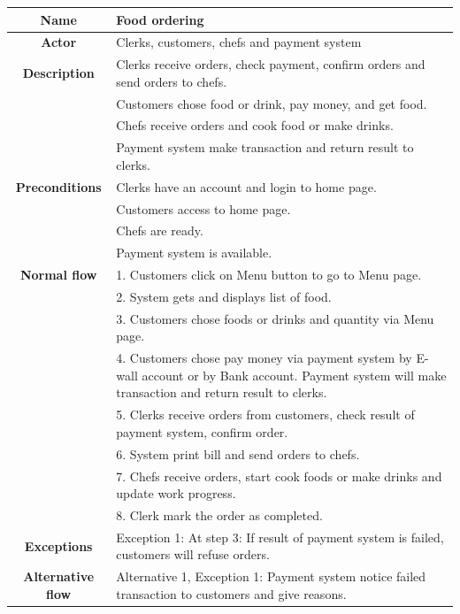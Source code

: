 \documentclass[11pt]{article}
\begin{document}
    \begin{table}[!h]
    \centering
        \begin{tabular}{|c|p{14cm}|}
        \hline
        \textbf{Name}  & \textbf{Food ordering} \\
        \hline
        \textbf{Actor} & Clerks, customers, chefs and payment system\\
        \hline
        \textbf{Description} & Clerks receive orders, check payment, confirm orders and send orders to chefs.\\
        {} & Customers chose food or drink, pay money, and get food.\\
        {} & Chefs receive orders and cook food or make drinks.\\
        {} & Payment system make transaction and return result to clerks.\\
        \hline
        \textbf{Preconditions} & Clerks have an account and login to home page.\\
        {} & Customers access to home page.\\
        {} & Chefs are ready.\\
        {} & Payment system is available.\\
        \hline
        \textbf{Normal flow} & 1. Customers click on Menu button to go to Menu page.\\
        {} & 2. System gets and displays list of food.\\
        {} & 3. Customers chose foods or drinks and quantity via Menu page.\\
        {} & 4. Customers chose pay money via payment system by E-wall account or by Bank account. Payment system will make transaction and return result to clerks.\\
        {} & 5. Clerks receive orders from customers, check result of payment system, confirm order.\\
        {} & 6. System print bill and send orders to chefs.\\
        {} & 7. Chefs receive orders, start cook foods or make drinks and update work progress.\\
        {} & 8. Clerk mark the order as completed.\\
        \hline
        \textbf{Exceptions} & Exception 1: At step 3: If result of payment system is failed, customers will refuse orders.\\
        \hline
        \textbf{Alternative flow} & Alternative 1, Exception 1: Payment system notice failed transaction to customers and give reasons.\\
        \hline
        \end{tabular}
    \end{table}
\end{document}
